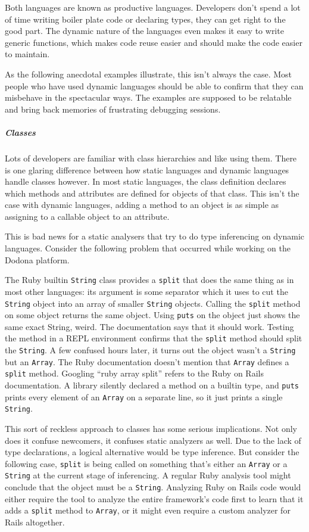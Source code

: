 \documentclass[]{article}
\let\oldsubparagraph\subparagraph
\renewcommand{\subparagraph}[1]{\oldsubparagraph{#1}\mbox{}}
\begin{document}
Both languages are known as productive languages. Developers don't spend
a lot of time writing boiler plate code or declaring types, they can get
right to the good part. The dynamic nature of the languages even makes
it easy to write generic functions, which makes code reuse easier and
should make the code easier to maintain.

As the following anecdotal examples illustrate, this isn't always the
case. Most people who have used dynamic languages should be able to
confirm that they can misbehave in the spectacular ways. The examples
are supposed to be relatable and bring back memories of frustrating
debugging sessions.

\subparagraph{Classes}\label{classes}

Lots of developers are familiar with class hierarchies and like using
them. There is one glaring difference between how static languages and
dynamic languages handle classes however. In most static languages, the
class definition declares which methods and attributes are defined for
objects of that class. This isn't the case with dynamic languages,
adding a method to an object is as simple as assigning to a callable
object to an attribute.

This is bad news for a static analysers that try to do type inferencing
on dynamic languages. Consider the following problem that occurred while
working on the Dodona platform.

The Ruby builtin \texttt{String} class provides a \texttt{split} that
does the same thing as in most other languages: its argument is some
separator which it uses to cut the \texttt{String} object into an array
of smaller \texttt{String} objects. Calling the \texttt{split} method on
some object returns the same object. Using \texttt{puts} on the object
just shows the same exact String, weird. The documentation says that it
should work. Testing the method in a REPL environment confirms that the
\texttt{split} method should split the \texttt{String}. A few confused
hours later, it turns out the object wasn't a \texttt{String} but an
\texttt{Array}. The Ruby documentation doesn't mention that
\texttt{Array} defines a \texttt{split} method. Googling ``ruby array
split'' refers to the Ruby on Rails documentation. A library silently
declared a method on a builtin type, and \texttt{puts} prints every
element of an \texttt{Array} on a separate line, so it just prints a
single \texttt{String}.

This sort of reckless approach to classes has some serious implications.
Not only does it confuse newcomers, it confuses static analyzers as
well. Due to the lack of type declarations, a logical alternative would
be type inference. But consider the following case, \texttt{split} is
being called on something that's either an \texttt{Array} or a
\texttt{String} at the current stage of inferencing. A regular Ruby
analysis tool might conclude that the object must be a \texttt{String}.
Analyzing Ruby on Rails code would either require the tool to analyze
the entire framework's code first to learn that it adds a \texttt{split}
method to \texttt{Array}, or it might even require a custom analyzer for
Rails altogether.
\end{document}

